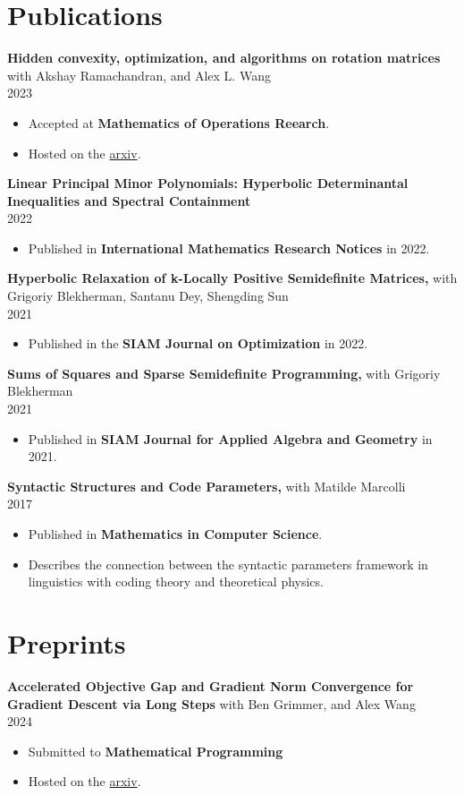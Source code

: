 \documentclass[margin]{res}
\begin{document}
\begin{resume}
\section{Publications}
{\bf  Hidden convexity, optimization, and algorithms on rotation matrices  } with Akshay Ramachandran, and Alex L. Wang\\ 2023
\begin{itemize} \itemsep -2pt %
\item Accepted at \textbf{Mathematics of Operations Reearch}.
\item Hosted on the \href{https://arxiv.org/abs/2304.08596}{arxiv}.
\end{itemize}
{\bf  Linear Principal Minor Polynomials: Hyperbolic Determinantal Inequalities and Spectral Containment } \\ 2022
\begin{itemize} \itemsep -2pt %
\item Published in \textbf{International Mathematics Research Notices} in 2022.
\end{itemize}
{\bf    Hyperbolic Relaxation of k-Locally Positive Semidefinite Matrices,} with Grigoriy Blekherman, Santanu Dey, Shengding Sun\\ 2021
\begin{itemize} \itemsep -2pt %
\item Published in the \textbf{SIAM Journal on Optimization} in 2022.
\end{itemize}
{\bf   Sums of Squares and Sparse Semidefinite Programming,} with Grigoriy Blekherman \\ 2021
\begin{itemize} \itemsep -2pt %
\item Published in \textbf{SIAM Journal for Applied Algebra and Geometry} in 2021.
\end{itemize}
{\bf  Syntactic Structures and Code Parameters,} with Matilde Marcolli \\ 2017
\begin{itemize} \itemsep -2pt %
\item Published in \textbf{Mathematics in Computer Science}.
\item Describes the connection between the syntactic parameters framework in linguistics with coding theory and theoretical physics.
\end{itemize}

\section{Preprints}
{\bf  Accelerated Objective Gap and Gradient Norm Convergence for Gradient Descent via Long Steps} with Ben Grimmer, and Alex Wang \\ 2024
\begin{itemize} \itemsep -2pt %
\item Submitted to \textbf{Mathematical Programming}
\item Hosted on the \href{https://arxiv.org/abs/2403.14045}{arxiv}.
\end{itemize}


\end{resume}
\end{document}
